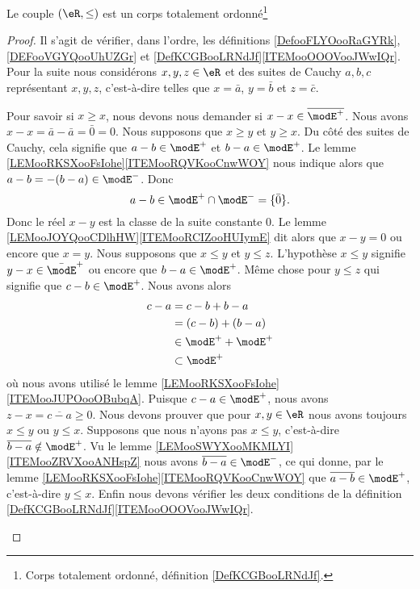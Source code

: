 \begin{proposition} \label{PROPooYMJVooNAsXae}
	Le couple \( (\eR,\leq)\) est un corps totalement ordonné\footnote{Corps totalement ordonné, définition \ref{DefKCGBooLRNdJf}.}
\end{proposition}

\begin{proof}
	Il s'agit de vérifier, dans l'ordre, les définitions \ref{DefooFLYOooRaGYRk}, \ref{DEFooVGYQooUhUZGr} et \ref{DefKCGBooLRNdJf}\ref{ITEMooOOOVooJWwIQr}. Pour la suite nous considérons \( x,y,z\in \eR\) et des suites de Cauchy \( a,b,c\) représentant \( x,y,z\), c'est-à-dire telles que \( x=\bar a\), \( y=\bar b\) et \( z=\bar c\).
	\begin{subproof}
		\spitem[Réflexivité]
		Pour savoir si \( x\geq x\), nous devons nous demander si \( x-x\in\overline{ \modE^+ }\). Nous avons \( x-x=\bar a-\bar a=\bar 0=0\).
		\spitem[antisymétrie]
		Nous supposons que \( x\geq y\) et \( y\geq x\). Du côté des suites de Cauchy, cela signifie que \( a-b\in\modE^+\) et \( b-a\in \modE^+\). Le lemme \ref{LEMooRKSXooFsIohe}\ref{ITEMooRQVKooCnwWOY} nous indique alors que \( a-b=-(b-a)\in \modE^-\). Donc
		\begin{equation}
			a-b\in\modE^+\cap\modE^-=\{ \bar 0 \}.
		\end{equation}
		Donc le réel \( x-y\) est la classe de la suite constante \( 0\). Le lemme \ref{LEMooJOYQooCDlhHW}\ref{ITEMooRCIZooHUIymE} dit alors que \( x-y=0\) ou encore que \( x=y\).
		\spitem[transitivité]
		Nous supposons que \( x\leq y\) et \( y\leq z\). L'hypothèse \( x\leq y\) signifie \( y-x\in\bar\modE^+\) ou encore que \( b-a\in\modE^+\). Même chose pour \( y\leq z\) qui signifie que \( c-b\in\modE^+\). Nous avons alors
		\begin{subequations}
			\begin{align}
				c-a & =c-b+b-a            \\
				    & =(c-b)+(b-a)        \\
				    & \in \modE^++\modE^+ \\
				    & \subset \modE^+
			\end{align}
		\end{subequations}
		où nous avons utilisé le lemme \ref{LEMooRKSXooFsIohe}\ref{ITEMooJUPOooOBubqA}. Puisque \( c-a\in\modE^+\), nous avons \( z-x=\overline{ c-a }\geq 0\).
		Nous devons prouver que pour \( x,y\in \eR\) nous avons toujours \( x\leq y\) ou \( y\leq x\). Supposons que nous n'ayons pas \( x\leq y\), c'est-à-dire \( \overline{ b-a }\notin \modE^+\). Vu le lemme \ref{LEMooSWYXooMKMLYI}\ref{ITEMooZRVXooANHspZ} nous avons \( \overline{ b-a }\in \modE^-\), ce qui donne, par le lemme \ref{LEMooRKSXooFsIohe}\ref{ITEMooRQVKooCnwWOY} que \( \overline{ a-b }\in \modE^+\), c'est-à-dire \( y\leq x\).
		Enfin nous devons vérifier les deux conditions de la définition \ref{DefKCGBooLRNdJf}\ref{ITEMooOOOVooJWwIQr}.


\end{subproof}
\end{proof}
